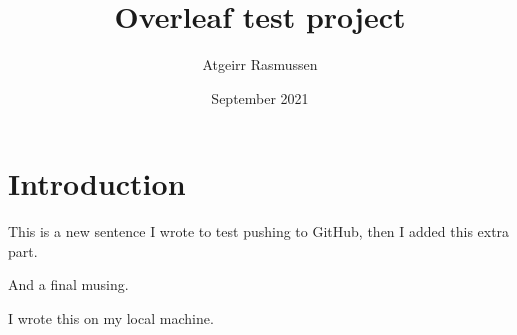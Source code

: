 \documentclass{article}
\title{Overleaf test project}
\author{Atgeirr Rasmussen}
\date{September 2021}
\begin{document}
\maketitle

\section{Introduction}

This is a new sentence I wrote to test pushing to GitHub, then I added this extra part.

And a final musing.


I wrote this on my local machine.
\end{document}
